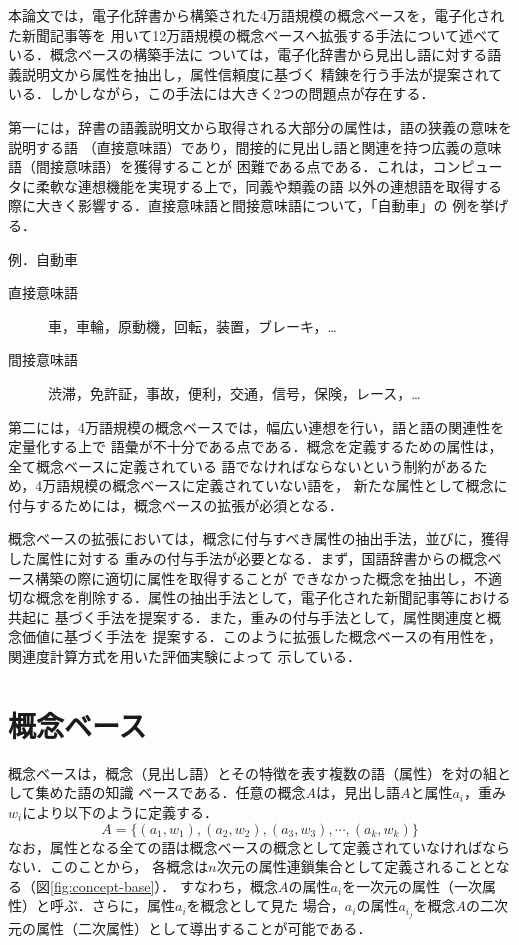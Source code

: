 \documentclass[japanese]{jnlp_1.3e}
\begin{document}
本論文では，電子化辞書から構築された4万語規模の概念ベースを，電子化された新聞記事等を
用いて12万語規模の概念ベースへ拡張する手法について述べている．概念ベースの構築手法に
ついては，電子化辞書から見出し語に対する語義説明文から属性を抽出し，属性信頼度に基づく
精錬を行う手法が提案されている．しかしながら，この手法には大きく2つの問題点が存在する．

第一には，辞書の語義説明文から取得される大部分の属性は，語の狭義の意味を説明する語
（直接意味語）であり，間接的に見出し語と関連を持つ広義の意味語（間接意味語）を獲得することが
困難である点である．これは，コンピュータに柔軟な連想機能を実現する上で，同義や類義の語
以外の連想語を取得する際に大きく影響する．直接意味語と間接意味語について，「自動車」の
例を挙げる．

\noindent
例．自動車
\begin{description}
\item[直接意味語] 車，車輪，原動機，回転，装置，ブレーキ，…
\item[間接意味語] 渋滞，免許証，事故，便利，交通，信号，保険，レース，…
\end{description}

第二には，4万語規模の概念ベースでは，幅広い連想を行い，語と語の関連性を定量化する上で
語彙が不十分である点である．概念を定義するための属性は，全て概念ベースに定義されている
語でなければならないという制約があるため，4万語規模の概念ベースに定義されていない語を，
新たな属性として概念に付与するためには，概念ベースの拡張が必須となる．

概念ベースの拡張においては，概念に付与すべき属性の抽出手法，並びに，獲得した属性に対する
重みの付与手法が必要となる．まず，国語辞書からの概念ベース構築の際に適切に属性を取得することが
できなかった概念を抽出し，不適切な概念を削除する．属性の抽出手法として，電子化された新聞記事等における共起に
基づく手法を提案する．また，重みの付与手法として，属性関連度と概念価値に基づく手法を
提案する．このように拡張した概念ベースの有用性を，関連度計算方式を用いた評価実験によって
示している．


\section{概念ベース}

概念ベース\cite{kojima2004,hirose2002}は，概念（見出し語）とその特徴を表す複数の語（属性）を対の組として集めた語の知識
ベースである．任意の概念$A$は，見出し語$A$と属性$a_i$，重み$w_i$により以下のように定義する．
\begin{equation}
A=\{(a_1,w_1),(a_2,w_2),(a_3,w_3),\cdots,(a_k,w_k)\}
\end{equation}
なお，属性となる全ての語は概念ベースの概念として定義されていなければならない．このことから，
各概念は$n$次元の属性連鎖集合として定義されることとなる（図\ref{fig:concept-base}）．
すなわち，概念$A$の属性$a_i$を一次元の属性（一次属性）と呼ぶ．さらに，属性$a_i$を概念として見た
場合，$a_i$の属性$a_{i_j}$を概念$A$の二次元の属性（二次属性）として導出することが可能である．
\end{document}
